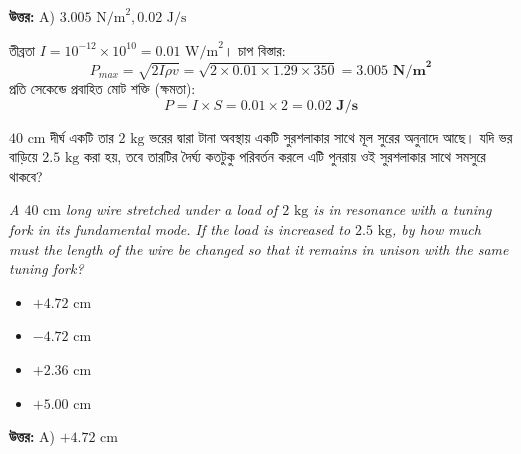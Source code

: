 \documentclass[12pt, a4paper]{article}
\begin{document}
\vspace{0.5em}
\begin{tcolorbox}[answerbox]
    \textbf{\color{success} উত্তর:} A) $3.005\text{ N/m}^2, 0.02\text{ J/s}$
\end{tcolorbox}
\vspace{1em}

\begin{tcolorbox}[solutionbox={সমাধান (Solution)}]
    \noindent
    তীব্রতা $I = 10^{-12} \times 10^{10} = 0.01\text{ W/m}^2$। চাপ বিস্তার:
    \[ P_{max} = \sqrt{2 I \rho v} = \sqrt{2 \times 0.01 \times 1.29 \times 350} = \mathbf{3.005\text{ N/m}^2} \]
    প্রতি সেকেন্ডে প্রবাহিত মোট শক্তি (ক্ষমতা):
    \[ P = I \times S = 0.01 \times 2 = \mathbf{0.02\text{ J/s}} \]
\end{tcolorbox}

\vspace{2em}

\begin{tcolorbox}[questionbox={প্রশ্ন (Question) 25}]
    \noindent
    $40\text{ cm}$ দীর্ঘ একটি তার $2\text{ kg}$ ভরের দ্বারা টানা অবস্থায় একটি সুরশলাকার সাথে মূল সুরের অনুনাদে আছে। যদি ভর বাড়িয়ে $2.5\text{ kg}$ করা হয়, তবে তারটির দৈর্ঘ্য কতটুকু পরিবর্তন করলে এটি পুনরায় ওই সুরশলাকার সাথে সমসুরে থাকবে?
    
    \vspace{0.8em}
    \begin{english}
    \noindent\textit{\color{darkgray}
    A $40\text{ cm}$ long wire stretched under a load of $2\text{ kg}$ is in resonance with a tuning fork in its fundamental mode. If the load is increased to $2.5\text{ kg}$, by how much must the length of the wire be changed so that it remains in unison with the same tuning fork?
    }
    \end{english}
\end{tcolorbox}

\begin{itemize}[label={}, leftmargin=1cm, itemsep=0.5em]
    \item[\textbf{A)}] $+4.72\text{ cm}$
    \item[\textbf{B)}] $-4.72\text{ cm}$
    \item[\textbf{C)}] $+2.36\text{ cm}$
    \item[\textbf{D)}] $+5.00\text{ cm}$
\end{itemize}

\vspace{0.5em}
\begin{tcolorbox}[answerbox]
    \textbf{\color{success} উত্তর:} A) $+4.72\text{ cm}$
\end{tcolorbox}
\vspace{1em}
\end{document}
